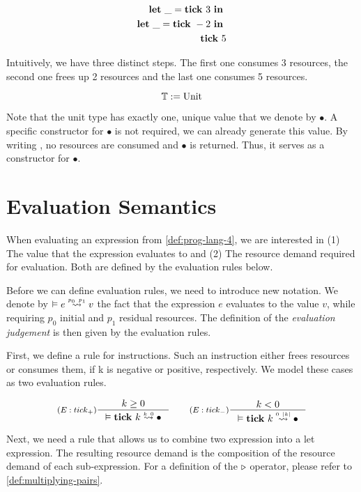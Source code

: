 \begin{example} \label{ex:let-tick-prog}
   \begin{align*}
   \mathbf{let}~\_ = \mathbf{tick}~3~\mathbf{in}~ \\
   \mathbf{let}~\_ = \mathbf{tick}~-2~\mathbf{in}~ \\
   \mathbf{tick}~5
   \end{align*}
\end{example}

Intuitively, we have three distinct steps. The first one consumes 3 resources, the second one frees up 2 resources and the last one consumes 5 resources. 

\begin{definition}\label{fig:type-system}
   \[\mathbb{T} := \text{Unit} \]
\end{definition}

Note that the unit type has exactly one, unique value that we denote by \(\bullet\). A specific constructor for \(\bullet\) is not required, we can already generate this value. By writing , no resources are consumed and \(\bullet\) is returned. Thus, it serves as a constructor for \(\bullet\).


\section{Evaluation Semantics}

When evaluating an expression from \cref{def:prog-lang-4}, we are interested in (1) The value that the expression evaluates to and (2) The resource demand required for evaluation. Both are defined by the evaluation rules below. 

Before we can define evaluation rules, we need to introduce new notation. We denote by \(\evals{}{e}{v}{p_0}{p_1}\) the fact that the expression \(e\) evaluates to the value \(v\), while requiring \(p_0\) initial and \(p_1\) residual resources. The definition of the \emph{evaluation judgement} is then given by the evaluation rules.

First, we define a rule for  instructions. Such an instruction either frees resources or consumes them, if k is negative or positive, respectively. We model these cases as two evaluation rules.

\[
   \inference[\((E:tick_{+})\)]
   {k \geq 0}
   {\evals{}{\tick{k}}{\bullet}{k}{0}}
   \qquad
   \inference[\((E:tick_{-})\)]
   {k < 0}
   {\evals{}{\tick{k}}{\bullet}{0}{|k|}}
\]

Next, we need a rule that allows us to combine two expression into a let expression. The resulting resource demand is the composition of the resource demand of each sub-expression. For a definition of the \(\triangleright\) operator, please refer to \cref{def:multiplying-pairs}.

